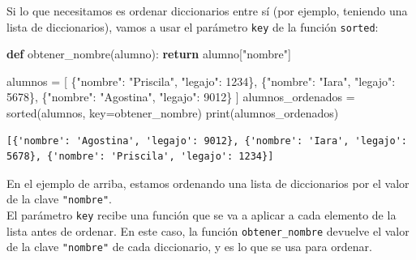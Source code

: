 \documentclass[
  letterpaper,
  DIV=11,
  numbers=noendperiod]{scrreprt}
\newenvironment{Shaded}{\begin{snugshade}}{\end{snugshade}}
\newcommand{\BuiltInTok}[1]{\textcolor[rgb]{0.00,0.23,0.31}{#1}}
\newcommand{\ControlFlowTok}[1]{\textcolor[rgb]{0.00,0.23,0.31}{\textbf{#1}}}
\newcommand{\DecValTok}[1]{\textcolor[rgb]{0.68,0.00,0.00}{#1}}
\newcommand{\KeywordTok}[1]{\textcolor[rgb]{0.00,0.23,0.31}{\textbf{#1}}}
\newcommand{\NormalTok}[1]{\textcolor[rgb]{0.00,0.23,0.31}{#1}}
\newcommand{\OperatorTok}[1]{\textcolor[rgb]{0.37,0.37,0.37}{#1}}
\newcommand{\StringTok}[1]{\textcolor[rgb]{0.13,0.47,0.30}{#1}}
\begin{document}
Si lo que necesitamos es ordenar diccionarios entre sí (por ejemplo,
teniendo una lista de diccionarios), vamos a usar el parámetro
\texttt{key} de la función \texttt{sorted}:

\begin{Shaded}
\begin{Highlighting}[]
\KeywordTok{def}\NormalTok{ obtener\_nombre(alumno):}
  \ControlFlowTok{return}\NormalTok{ alumno[}\StringTok{"nombre"}\NormalTok{]}

\NormalTok{alumnos }\OperatorTok{=}\NormalTok{ [}
\NormalTok{  \{}\StringTok{"nombre"}\NormalTok{: }\StringTok{"Priscila"}\NormalTok{, }\StringTok{"legajo"}\NormalTok{: }\DecValTok{1234}\NormalTok{\},}
\NormalTok{  \{}\StringTok{"nombre"}\NormalTok{: }\StringTok{"Iara"}\NormalTok{, }\StringTok{"legajo"}\NormalTok{: }\DecValTok{5678}\NormalTok{\},}
\NormalTok{  \{}\StringTok{"nombre"}\NormalTok{: }\StringTok{"Agostina"}\NormalTok{, }\StringTok{"legajo"}\NormalTok{: }\DecValTok{9012}\NormalTok{\}}
\NormalTok{]}
\NormalTok{alumnos\_ordenados }\OperatorTok{=} \BuiltInTok{sorted}\NormalTok{(alumnos, key}\OperatorTok{=}\NormalTok{obtener\_nombre)}
\BuiltInTok{print}\NormalTok{(alumnos\_ordenados)}
\end{Highlighting}
\end{Shaded}

\begin{verbatim}
[{'nombre': 'Agostina', 'legajo': 9012}, {'nombre': 'Iara', 'legajo': 5678}, {'nombre': 'Priscila', 'legajo': 1234}]
\end{verbatim}

\begin{tcolorbox}[enhanced jigsaw, arc=.35mm, toptitle=1mm, colframe=quarto-callout-note-color-frame, bottomtitle=1mm, opacitybacktitle=0.6, colbacktitle=quarto-callout-note-color!10!white, leftrule=.75mm, coltitle=black, toprule=.15mm, titlerule=0mm, title=\textcolor{quarto-callout-note-color}{\faInfo}\hspace{0.5em}{Note}, bottomrule=.15mm, rightrule=.15mm, colback=white, breakable, opacityback=0, left=2mm]

En el ejemplo de arriba, estamos ordenando una lista de diccionarios por
el valor de la clave \texttt{"nombre"}.\\
El parámetro \texttt{key} recibe una función que se va a aplicar a cada
elemento de la lista antes de ordenar. En este caso, la función
\texttt{obtener\_nombre} devuelve el valor de la clave \texttt{"nombre"}
de cada diccionario, y es lo que se usa para ordenar.

\end{tcolorbox}
\end{document}
